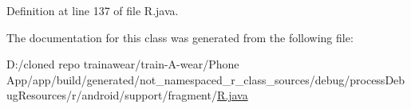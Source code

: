 Definition at line 137 of file R.\+java.



The documentation for this class was generated from the following file\+:\begin{DoxyCompactItemize}
\item 
D\+:/cloned repo trainawear/train-\/\+A-\/wear/\+Phone App/app/build/generated/not\+\_\+namespaced\+\_\+r\+\_\+class\+\_\+sources/debug/process\+Debug\+Resources/r/android/support/fragment/\mbox{\hyperlink{process_debug_resources_2r_2android_2support_2fragment_2_r_8java}{R.\+java}}\end{DoxyCompactItemize}
